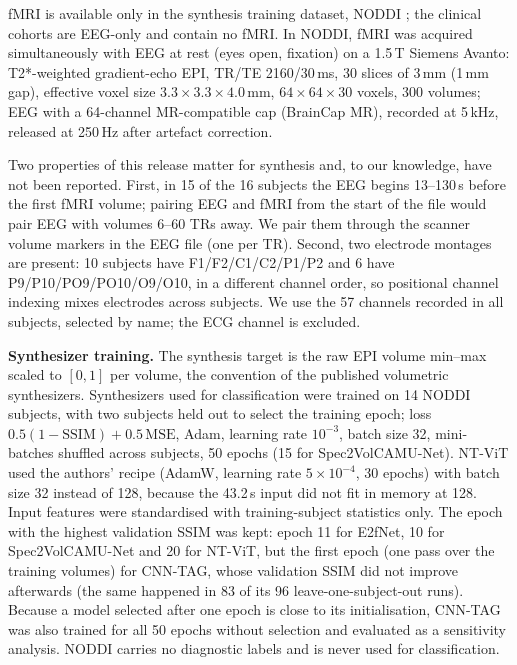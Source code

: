\documentclass[10pt]{article}
\begin{document}
fMRI is available only in the synthesis training dataset, NODDI \cite{dataset_01,deligianni2016}; the clinical cohorts are EEG-only and contain no fMRI. In NODDI, fMRI was acquired simultaneously with EEG at rest (eyes open, fixation) on a 1.5\,T Siemens Avanto: T2*-weighted gradient-echo EPI, TR/TE 2160/30\,ms, 30 slices of 3\,mm (1\,mm gap), effective voxel size $3.3\times3.3\times4.0$\,mm, $64\times64\times30$ voxels, 300 volumes; EEG with a 64-channel MR-compatible cap (BrainCap MR), recorded at 5\,kHz, released at 250\,Hz after artefact correction.

Two properties of this release matter for synthesis and, to our knowledge, have not been reported. First, in 15 of the 16 subjects the EEG begins 13--130\,s before the first fMRI volume; pairing EEG and fMRI from the start of the file would pair EEG with volumes 6--60 TRs away. We pair them through the scanner volume markers in the EEG file (one per TR). Second, two electrode montages are present: 10 subjects have F1/F2/C1/C2/P1/P2 and 6 have P9/P10/PO9/PO10/O9/O10, in a different channel order, so positional channel indexing mixes electrodes across subjects. We use the 57 channels recorded in all subjects, selected by name; the ECG channel is excluded.

\noindent\textbf{Synthesizer training.} The synthesis target is the raw EPI volume min--max scaled to $[0,1]$ per volume, the convention of the published volumetric synthesizers. Synthesizers used for classification were trained on 14 NODDI subjects, with two subjects held out to select the training epoch; loss $0.5(1-\mathrm{SSIM})+0.5\,\mathrm{MSE}$, Adam, learning rate $10^{-3}$, batch size 32, mini-batches shuffled across subjects, 50 epochs (15 for Spec2VolCAMU-Net). NT-ViT used the authors' recipe (AdamW, learning rate $5\times10^{-4}$, 30 epochs) with batch size 32 instead of 128, because the 43.2\,s input did not fit in memory at 128. Input features were standardised with training-subject statistics only. The epoch with the highest validation SSIM was kept: epoch 11 for E2fNet, 10 for Spec2VolCAMU-Net and 20 for NT-ViT, but the first epoch (one pass over the training volumes) for CNN-TAG, whose validation SSIM did not improve afterwards (the same happened in 83 of its 96 leave-one-subject-out runs). Because a model selected after one epoch is close to its initialisation, CNN-TAG was also trained for all 50 epochs without selection and evaluated as a sensitivity analysis. NODDI carries no diagnostic labels and is never used for classification.
\end{document}
